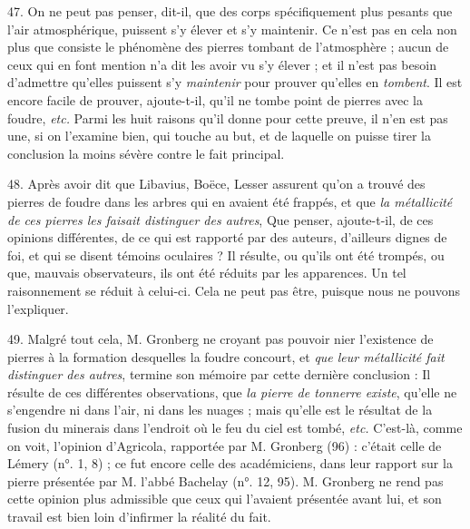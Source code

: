 \documentclass[a4paper, 11pt, oneside, polutonikogreek, french]{article}
\begin{document}
47. \og On ne peut pas penser, dit-il, que des corps spécifiquement plus pesants que l'air atmosphérique, puissent s'y élever et s'y maintenir. \fg Ce n'est pas en cela non plus que consiste le phénomène des pierres tombant de l'atmosphère ; aucun de ceux qui en font mention n'a dit les avoir vu s'y élever ; et il n'est pas besoin d'admettre qu'elles puissent s'y \emph{maintenir} pour prouver qu'elles en \emph{tombent}. Il est encore facile de prouver, ajoute-t-il, qu'il ne tombe point de pierres avec la foudre, \emph{etc.} Parmi les huit raisons qu'il donne pour cette preuve, il n'en est pas une, si on l'examine bien, qui touche au but, et de laquelle on puisse tirer la conclusion la moins sévère contre le fait principal.

48. Après avoir dit que Libavius, Boëce, Lesser assurent qu'on a trouvé des pierres de foudre dans les arbres qui en avaient été frappés, et que \emph{la métallicité de ces pierres les faisait distinguer des autres}, \og Que penser, ajoute-t-il, de ces opinions différentes, de ce qui est rapporté par des auteurs, d'ailleurs dignes de foi, et qui se disent témoins oculaires ? Il résulte, ou qu'ils ont été trompés, ou que, mauvais observateurs, ils ont été réduits par les apparences. \fg Un tel raisonnement se réduit à celui-ci. Cela ne peut pas être, puisque nous ne pouvons l'expliquer.

49. Malgré tout cela, M. Gronberg ne croyant pas pouvoir nier l'existence de pierres à la formation desquelles la foudre concourt, et \emph{que leur métallicité fait distinguer des autres}, termine son mémoire par cette dernière conclusion : \og Il résulte de ces différentes observations, que \emph{la pierre de tonnerre existe}, qu'elle ne s'engendre ni dans l'air, ni dans les nuages ; mais qu'elle est le résultat de la fusion du minerais dans l'endroit où le feu du ciel est tombé, \emph{etc.} \fg C'est-là, comme on voit, l'opinion d'Agricola, rapportée par M. Gronberg (96) : c'était celle de Lémery (n°. 1, 8) ; ce fut encore celle des académiciens, dans leur rapport sur la pierre présentée par M. l'abbé Bachelay (n°. 12, 95). M. Gronberg ne rend pas cette opinion plus admissible que ceux qui l'avaient présentée avant lui, et son travail est bien loin d'infirmer la réalité du fait.
\end{document}
